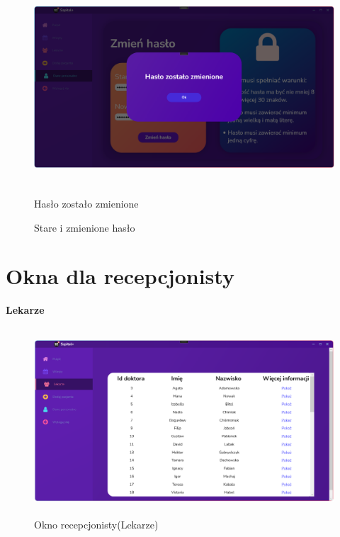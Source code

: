 \begin{figure}[H]
\begin{center}
    \includegraphics[height=8cm]{images/haslo_zos_zmien_katpa.png}
    \caption{Hasło zostało zmienione}
\end{center}
\end{figure}

\begin{figure}[H]
    \centering
    \caption{Stare i zmienione hasło}
\end{figure}

\newpage

\section{Okna dla recepcjonisty}
\Large\textbf{{Lekarze}}

\begin{figure}[H]
\begin{center}
    \includegraphics[height=7cm]{images/recep_lekarze.png}
    \caption{Okno recepcjonisty(Lekarze)}
\end{center}
\end{figure}

